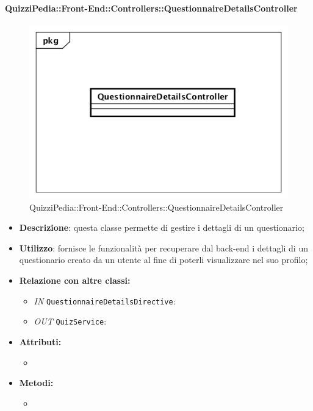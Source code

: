 \paragraph{QuizziPedia::Front-End::Controllers::QuestionnaireDetailsController}
\begin{figure}
	\centering
	\includegraphics[scale=0.45]{UML/Classi/Front-End/QuizziPedia_Front-end_Controller_QuestionnaireDetailsController.png}
	\caption{QuizziPedia::Front-End::Controllers::QuestionnaireDetailsController}
\end{figure}
\begin{itemize}
	\item \textbf{Descrizione}: questa classe permette di gestire i dettagli di un questionario; 
	\item \textbf{Utilizzo}: fornisce le funzionalità per recuperare dal back-end i dettagli di un questionario creato da un utente al fine di poterli visualizzare nel suo profilo;
	\item \textbf{Relazione con altre classi:}
	\begin{itemize}
		\item \textit{IN} \texttt{QuestionnaireDetailsDirective}:
		\item \textit{OUT} \texttt{QuizService}: 
	\end{itemize}
	\item \textbf{Attributi:}
	\begin{itemize}
		\item 
	\end{itemize}
	\item \textbf{Metodi:}
	\begin{itemize}
		\item 
	\end{itemize}
\end{itemize}

